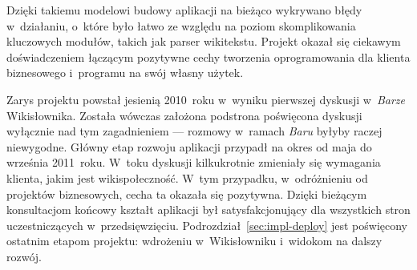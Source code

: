 Dzięki takiemu modelowi budowy aplikacji na bieżąco wykrywano błędy w~działaniu, o~które było łatwo ze względu na poziom skomplikowania kluczowych modułów, takich jak parser wikitekstu. Projekt okazał się ciekawym doświadczeniem łączącym pozytywne cechy tworzenia oprogramowania dla klienta biznesowego i~programu na swój własny użytek.

Zarys projektu powstał jesienią 2010~roku w~wyniku pierwszej dyskusji w~\emph{Barze} Wikisłownika. Została wówczas założona podstrona poświęcona dyskusji wyłącznie nad tym zagadnieniem --- rozmowy w~ramach \emph{Baru} byłyby raczej niewygodne. Główny etap rozwoju aplikacji przypadł na okres od maja do września 2011~roku. W~toku dyskusji kilkukrotnie zmieniały się wymagania klienta, jakim jest wikispołeczność. W~tym przypadku, w~odróżnieniu od projektów biznesowych, cecha ta okazała się pozytywna. Dzięki bieżącym konsultacjom końcowy kształt aplikacji był satysfakcjonujący dla wszystkich stron uczestniczących w~przedsięwzięciu. Podrozdział~\ref{sec:impl-deploy} jest poświęcony ostatnim etapom projektu: wdrożeniu w~Wikisłowniku i~widokom na dalszy rozwój.
